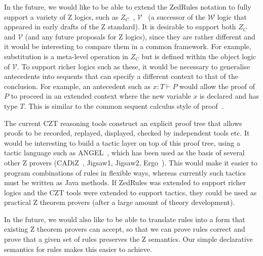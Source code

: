 \documentclass{entcs}
\newcommand{\V}{\mathcal{V}}
\newcommand{\Zc}{Z_C}
\begin{document}
In the future, we would like to be able to extend the ZedRules
notation to fully support a variety of Z logics, such as
$\Zc$~\cite{henson:revising-z-1-99,henson:revising-z-2-99},
$\V$~\cite{brien:calculus-schemas-z00} (a successor of the
$\mathcal{W}$ logic that appeared in early drafts of the Z standard).
It is desirable to support both $\Zc$ and $\V$ (and any future
proposals for Z logics), since they are rather different and it would
be interesting to compare them in a common framework.  For example,
substitution is a meta-level operation in $\Zc$ but is defined within
the object logic of $\V$.  To support richer logics such as these, it
would be necessary to generalise antecedents into sequents that can
specify a different context to that of the conclusion.  For example,
an antecedent such as $x:T \vdash P$ would allow the proof of $P$ to
proceed in an extended context where the new variable $x$ is declared
and has type $T$.  This is similar to the common sequent calculus
style of proof~\cite{girard:proofs-types90}.

The current CZT reasoning tools construct an explicit proof tree that
allows proofs to be recorded, replayed, displayed, checked by independent
tools etc.
It would be interesting to build a tactic layer on top of this proof
tree, using a tactic language such as ANGEL~\cite{martin:tactics}, which
has been used as the basis of several other Z provers
(CADiZ~\cite{Toyn98a}, Jigsaw1, Jigsaw2,
Ergo~\cite{martin:tac-lang-for-ergo}).
This would make it easier to program combinations of rules 
in flexible ways, whereas currently such tactics must be written as
Java methods.
If ZedRules was extended to support richer logics and the CZT tools were 
extended to support tactics, they could be used as practical Z theorem
provers (after a large amount of theory development).

In the future, we would also like to be able to translate rules
into a form that existing Z theorem provers can accept, so that we can prove
rules correct and prove that a given set of rules preserves the Z
semantics.  Our simple declarative semantics for rules makes this
easier to achieve.



\end{document}
